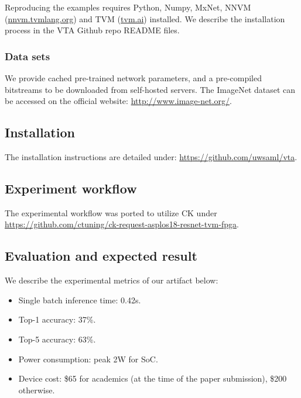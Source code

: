\documentclass[sigconf]{acmart}
\begin{document}
Reproducing the examples requires Python, Numpy, MxNet, NNVM (\url{nnvm.tvmlang.org}) and TVM  (\url{tvm.ai}) installed. We describe the installation process in the VTA Github repo README files.

\subsubsection{Data sets}

We provide cached pre-trained network parameters, and a pre-compiled bitstreams to be downloaded from self-hosted servers.
The ImageNet dataset can be accessed on the official website: \url{http://www.image-net.org/}.

\subsection{Installation}

The installation instructions are detailed under: \url{https://github.com/uwsaml/vta}.

\subsection{Experiment workflow}

The experimental workflow was ported to utilize CK under \url{https://github.com/ctuning/ck-request-asplos18-resnet-tvm-fpga}.

\subsection{Evaluation and expected result}
We describe the experimental metrics of our artifact below:
\begin{itemize}
\item Single batch inference time: 0.42s.
\item Top-1 accuracy: 37\%.
\item Top-5 accuracy: 63\%.
\item Power consumption: peak 2W for SoC.
\item Device cost: \$65 for academics (at the time of the paper submission), \$200 otherwise.
\end{itemize}

\end{document}
